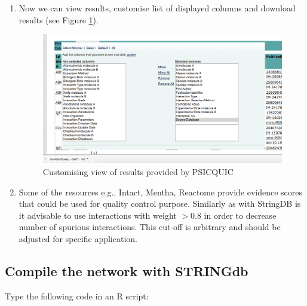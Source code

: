 \documentclass[11pt, oneside]{article}   	%
\begin{document}
\begin{enumerate}
   \item Now we can view results, customise list of displayed columns and download results (see Figure \ref{fig:psicquic3}).
   

   \begin{figure}[!h]
	\centering
	\includegraphics[width=\textwidth]{psicquic3}
	\caption{Customising view of results provided by PSICQUIC}
	\label{fig:psicquic3}
   \end{figure}


   \item Some of the resources e.g., Intact, Mentha, Reactome provide evidence scores that could be used for quality control purpose. Similarly as with StringDB is it advisable to use interactions with weight $>0.8$  in order to decrease number of spurious interactions. This cut-off is arbitrary and should be adjusted for specific application. 

\end{enumerate}


\subsection{Compile the network with STRINGdb}

Type the following code in an R script:
\end{document}
